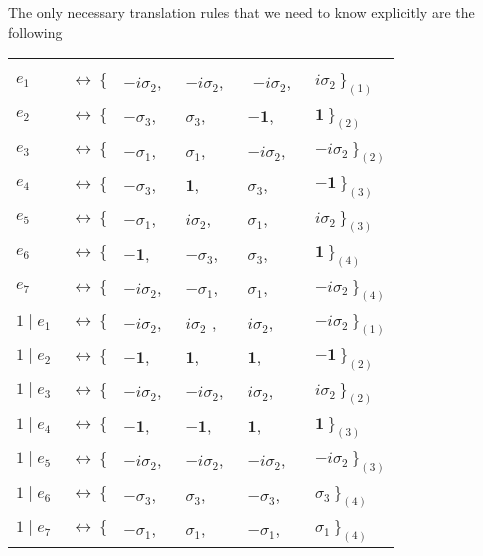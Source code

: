 \documentclass[a4paper,12pt]{book}
\begin{document}
The only necessary translation rules that we need to know explicitly are the
following

\begin{center}
\begin{tabular}{llllll}
&  &  &  &  &  \\ 
${e_{1}}$ & $~\leftrightarrow ~\{$ & $-i\sigma _{2}$, & ~$-i\sigma _{2}$, & ~%
$-i\sigma _{2}$, & ~$i\sigma _{2}~\}_{(1)}$ \\ 
${e_{2}}$ & $~\leftrightarrow ~\{$ & $-\sigma _{3}$, & ~$\sigma _{3}$, & ~$-%
\mathbf{1}$, & ~$\mathbf{1}~\}_{(2)}$ \\ 
${e_{3}}$ & $~\leftrightarrow ~\{$ & $-\sigma _{1}$, & ~$\sigma _{1}$, & ~$%
-i\sigma _{2}$, & ~$-i\sigma _{2}~\}_{(2)}$ \\ 
${e_{4}}$ & $~\leftrightarrow ~\{$ & $-\sigma _{3}$, & ~$\mathbf{1}$, & ~$%
\sigma _{3}$, & ~$-\mathbf{1}~\}_{(3)}$ \\ 
${e_{5}}$ & $~\leftrightarrow ~\{$ & $-\sigma _{1}$, & ~$i\sigma _{2}$, & ~$%
\sigma _{1}$, & ~$i\sigma _{2}~\}_{(3)}$ \\ 
${e_{6}}$ & $~\leftrightarrow ~\{$ & $-\mathbf{1}$, & ~$-\sigma _{3}$, & ~$%
\sigma _{3}$, & ~$\mathbf{1}~\}_{(4)}$ \\ 
${e_{7}}$ & $~\leftrightarrow ~\{$ & $-i\sigma _{2}$, & ~$-\sigma _{1}$, & ~$%
\sigma _{1}$, & ~$-i\sigma _{2}~\}_{(4)}$ \\ 
${1\mid e_{1}}$ & $~\leftrightarrow ~\{$ & $-i\sigma _{2}$, & ~$i\sigma _{2}$%
, & ~$i\sigma _{2}$, & ~$-i\sigma _{2}~\}_{(1)}$ \\ 
${1\mid e_{2}}$ & $~\leftrightarrow ~\{$ & $-\mathbf{1}$, & ~$\mathbf{1}$, & 
~$\mathbf{1}$, & ~$-\mathbf{1}~\}_{(2)}$ \\ 
${1\mid e_{3}}$ & $~\leftrightarrow ~\{$ & $-i\sigma _{2}$, & ~$-i\sigma
_{2} $, & ~$i\sigma _{2}$, & ~$i\sigma _{2}~\}_{(2)}$ \\ 
${1\mid e_{4}}$ & $~\leftrightarrow ~\{$ & $-\mathbf{1}$, & ~$-\mathbf{1}$,
& ~$\mathbf{1}$, & ~$\mathbf{1}~\}_{(3)}$ \\ 
${1\mid e_{5}}$ & $~\leftrightarrow ~\{$ & $-i\sigma _{2}$, & ~$-i\sigma
_{2} $, & ~$-i\sigma _{2}$, & ~$-i\sigma _{2}~\}_{(3)}$ \\ 
${1\mid e_{6}}$ & $~\leftrightarrow ~\{$ & $-\sigma _{3}$, & ~$\sigma _{3}$,
& ~$-\sigma _{3}$, & ~$\sigma _{3}~\}_{(4)}$ \\ 
${1\mid e_{7}}$ & $~\leftrightarrow ~\{$ & $-\sigma _{1}$, & ~$\sigma _{1}$,
& ~$-\sigma _{1}$, & ~$\sigma _{1}~\}_{(4)}$%
\end{tabular}
\end{center}
\end{document}
